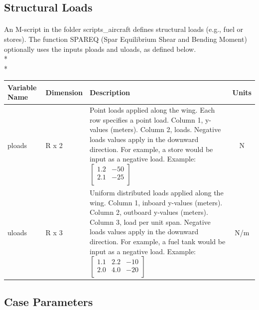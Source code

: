\documentclass{article}
\begin{document}
\subsection{Structural Loads}\label{sec:sl}
\paragraph{}
An M-script in the folder scripts\_aircraft defines structural loads
(e.g., fuel or stores).  The function SPAREQ (Spar Equilibrium Shear
and Bending Moment) optionally uses the inputs ploads and uloads, as
defined below.\\*\\*
\begin{tabular}{|l|l|p{2.5in}|c|}
  \hline
  \textbf{Variable Name} &
  \textbf{Dimension} &
  \textbf{Description} &
  \textbf{Units}
  \\
  \hline
  ploads & R x 2 &
  Point loads applied along the wing.  Each row specifies a point
  load.  Column 1, y-values (meters).  Column 2, loads.  Negative
  loads values apply in the downward direction.  For example, a store
  would be input as a negative load.  Example:
  $\begin{bmatrix}1.2&-50\\2.1&-25\\\end{bmatrix}$ &
  N
  \\
  \hline
  uloads & R x 3 &
  Uniform distributed loads applied along the wing.  Column 1, inboard
  y-values (meters).  Column 2, outboard y-values (meters).  Column 3,
  load per unit span.  Negative loads values apply in the downward
  direction.  For example, a fuel tank would be input as a negative
  load.  Example:
  $\begin{bmatrix}1.1&2.2&-10\\2.0&4.0&-20\\\end{bmatrix}$ &
  N/m
  \\
  \hline
\end{tabular}
\subsection{Case Parameters}\label{sec:cp}
\end{document}
